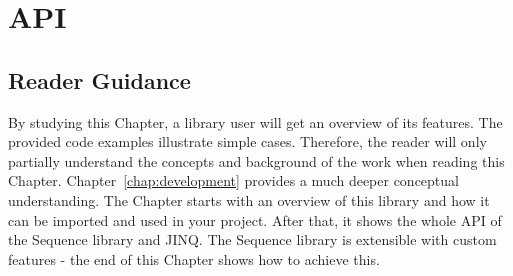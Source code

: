 \chapter{API} %
\label{chap:api}

\section*{Reader Guidance} %
\label{sec:api_reader_guidance}
By studying this Chapter, a library user will get an overview of its features.
The provided code examples illustrate simple cases. Therefore, the reader will
only partially understand the concepts and background of the work when reading
this Chapter. Chapter~\ref{chap:development} provides a much deeper conceptual
understanding. The Chapter starts with an overview of this library and how it
can be imported and used in your project. After that, it shows the whole API of
the Sequence library and JINQ. The Sequence library is extensible with custom
features - the end of this Chapter shows how to achieve this.











